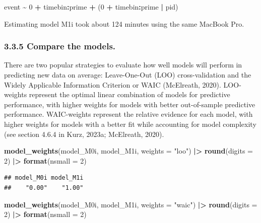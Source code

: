 \documentclass[
  english,
  man, donotrepeattitle,floatsintext]{apa6}
\newenvironment{Shaded}{\begin{snugshade}}{\end{snugshade}}
\newcommand{\AttributeTok}[1]{\textcolor[rgb]{0.13,0.29,0.53}{#1}}
\newcommand{\DecValTok}[1]{\textcolor[rgb]{0.00,0.00,0.81}{#1}}
\newcommand{\FunctionTok}[1]{\textcolor[rgb]{0.13,0.29,0.53}{\textbf{#1}}}
\newcommand{\NormalTok}[1]{#1}
\newcommand{\SpecialCharTok}[1]{\textcolor[rgb]{0.81,0.36,0.00}{\textbf{#1}}}
\newcommand{\StringTok}[1]{\textcolor[rgb]{0.31,0.60,0.02}{#1}}
\begin{document}
\begin{Shaded}
\begin{Highlighting}[]
\NormalTok{event }\SpecialCharTok{\textasciitilde{}} \DecValTok{0} \SpecialCharTok{+}\NormalTok{ timebin}\SpecialCharTok{:}\NormalTok{prime }\SpecialCharTok{+}\NormalTok{ (}\DecValTok{0} \SpecialCharTok{+}\NormalTok{ timebin}\SpecialCharTok{:}\NormalTok{prime }\SpecialCharTok{|}\NormalTok{ pid)}
\end{Highlighting}
\end{Shaded}

Estimating model M1i took about 124 minutes using the same MacBook Pro.

\subsubsection{3.3.5 Compare the models.}\label{compare-the-models.}

There are two popular strategies to evaluate how well models will perform in predicting new data on average: Leave-One-Out (LOO) cross-validation and the Widely Applicable Information Criterion or WAIC (McElreath, 2020). LOO-weights represent the optimal linear combination of models for predictive performance, with higher weights for models with better out-of-sample predictive performance. WAIC-weights represent the relative evidence for each model, with higher weights for models with a better fit while accounting for model complexity (see section 4.6.4 in Kurz, 2023a; McElreath, 2020).

\footnotesize

\begin{Shaded}
\begin{Highlighting}[]
\FunctionTok{model\_weights}\NormalTok{(model\_M0i, model\_M1i, }\AttributeTok{weights =} \StringTok{"loo"}\NormalTok{) }\SpecialCharTok{|\textgreater{}}
  \FunctionTok{round}\NormalTok{(}\AttributeTok{digits =} \DecValTok{2}\NormalTok{) }\SpecialCharTok{|\textgreater{}}
  \FunctionTok{format}\NormalTok{(}\AttributeTok{nsmall =} \DecValTok{2}\NormalTok{)}
\end{Highlighting}
\end{Shaded}

\begin{verbatim}
## model_M0i model_M1i 
##    "0.00"    "1.00"
\end{verbatim}

\begin{Shaded}
\begin{Highlighting}[]
\FunctionTok{model\_weights}\NormalTok{(model\_M0i, model\_M1i, }\AttributeTok{weights =} \StringTok{"waic"}\NormalTok{) }\SpecialCharTok{|\textgreater{}}
  \FunctionTok{round}\NormalTok{(}\AttributeTok{digits =} \DecValTok{2}\NormalTok{) }\SpecialCharTok{|\textgreater{}}
  \FunctionTok{format}\NormalTok{(}\AttributeTok{nsmall =} \DecValTok{2}\NormalTok{)}
\end{Highlighting}
\end{Shaded}
\end{document}
